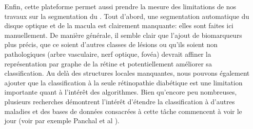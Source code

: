 Enfin, cette plateforme permet aussi prendre la mesure des limitations de nos travaux sur la segmentation du \fundus{}. Tout d'abord, une segmentation automatique du disque optique et de la macula est clairement manquante: elles sont faites ici manuellement. De manière générale, il semble clair que l'ajout de biomarqueurs plus précis, que ce soient d'autres classes de lésions ou qu'ils soient non pathologiques (arbre vasculaire, nerf optique, fovéa) devrait affiner la représentation par graphe de la rétine et potentiellement améliorer sa classification. Au delà des structures locales manquantes, nous pouvons également ajouter que la classification à la seule rétinopathie diabétique est une limitation importante quant à l'intérêt des algorithmes. Bien qu'encore peu nombreuses, plusieurs recherches démontrent l'intérêt d'étendre la classification à d'autres maladies et des bases de données consacrées à cette tâche commencent à voir le jour (voir par exemple Panchal et al \cite{panchalRetinalFundusMultiDisease2023}). 



